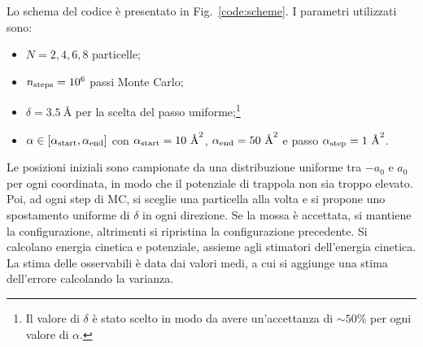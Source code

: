 \documentclass[a4paper, titlepage]{article}
\begin{document}
Lo schema del codice è presentato in Fig.\ \ref{code:scheme}. I parametri utilizzati sono:
\begin{itemize}
    \item $N = 2, 4, 6, 8$ particelle;
    \item $n_{\rm steps} = 10^6$ passi Monte Carlo;
    \item $\delta = 3.5\ \unit{\angstrom}$ per la scelta del passo uniforme;\footnote{Il valore di $\delta$ è stato scelto in modo da avere un'accettanza di $\sim 50\%$ per ogni valore di $\alpha$.}
    \item $\alpha \in [\alpha_{\rm start}, \alpha_{\rm end}]$ con $\alpha_{\rm start} = 10\ \unit{\angstrom\squared}$, $\alpha_{\rm end} = 50\ \unit{\angstrom\squared}$ e passo $\alpha_{\rm step} = 1\ \unit{\angstrom\squared}$.
\end{itemize}
Le posizioni iniziali sono campionate da una distribuzione uniforme tra $-a_0$ e $a_0$ per ogni coordinata, in modo che il potenziale di trappola non sia troppo elevato. Poi, ad ogni step di MC, si sceglie una particella alla volta e si propone uno spostamento uniforme di $\delta$ in ogni direzione. Se la mossa è accettata, si mantiene la configurazione, altrimenti si ripristina la configurazione precedente. Si calcolano energia cinetica e potenziale, assieme agli stimatori dell'energia cinetica. La stima delle osservabili è data dai valori medi, a cui si aggiunge una stima dell'errore calcolando la varianza.
\end{document}

